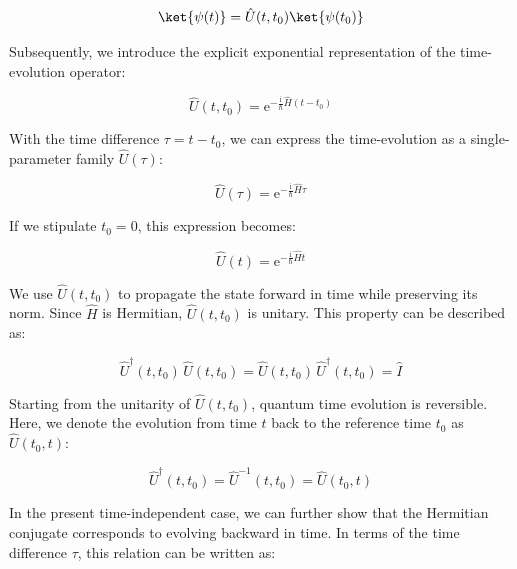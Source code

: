 \begin{equation}
    \ket{\psi(t)}=\hat{U}(t,t_0)\ket{\psi(t_0)}
\label{state_time_evolution}
\end{equation}

Subsequently, we introduce the explicit exponential representation of the time-evolution operator:

\begin{equation}
    \hat{U}(t,t_0)=\mathrm{e}^{-\frac{\mathrm{i}}{\hbar}\hat{H}(t-t_0)}
\label{time_evolution_operator}
\end{equation}

With the time difference $\tau=t-t_0$, we can express the time-evolution as a single-parameter family $\hat{U}(\tau)$:

\begin{equation}
    \hat{U}(\tau)=\mathrm{e}^{-\frac{\mathrm{i}}{\hbar}\hat{H}\tau}
\label{time_evolution_operator_tau}
\end{equation}

If we stipulate $t_0=0$, this expression becomes:

\begin{equation}
    \hat{U}(t)=\mathrm{e}^{-\frac{\mathrm{i}}{\hbar}\hat{H}t}
\label{time_evolution_operator_reduced_form}
\end{equation}

We use $\hat{U}(t,t_0)$ to propagate the state forward in time while preserving its norm.
Since $\hat{H}$ is Hermitian, $\hat{U}(t,t_0)$ is unitary.
This property can be described as:

\begin{equation}
    \hat{U}^\dagger(t,t_0)\,\hat{U}(t,t_0)=\hat{U}(t,t_0)\,\hat{U}^\dagger(t,t_0) = \hat{I}
\label{evolution_unitarity}
\end{equation}

Starting from the unitarity of $\hat{U}(t,t_0)$, quantum time evolution is reversible.
Here, we denote the evolution from time $t$ back to the reference time $t_0$ as $\hat{U}(t_0,t)$:

\begin{equation}
    \hat{U}^{\dagger}(t,t_0)= \hat{U}^{-1}(t,t_0) = \hat{U}(t_0,t)
\label{time_evolution_reversible}
\end{equation}

In the present time-independent case, we can further show that the Hermitian conjugate corresponds to evolving backward in time.
In terms of the time difference $\tau$, this relation can be written as:

